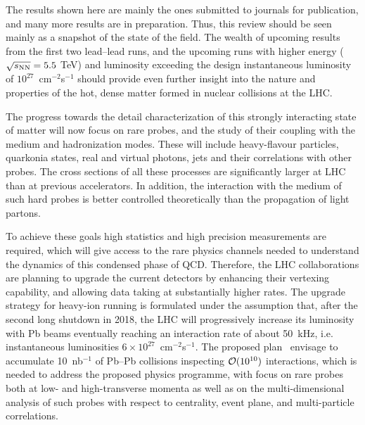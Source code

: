 The results shown here are mainly the ones submitted to journals for publication, and many more
results are in preparation.  Thus, this review should be seen mainly as a snapshot of
the state of the field.  The wealth of upcoming results from the first two lead--lead runs,
and the upcoming runs with higher energy ($\mbox{$\sqrt{s_{\mathrm{NN}}}$} = 5.5$ TeV) and luminosity
exceeding the design instantaneous luminosity of $10^{27}$~cm$^{-2}$s$^{-1}$ should
provide even further insight into
the nature and properties of the hot, dense matter formed in nuclear collisions at the LHC.

The progress towards the detail characterization of this strongly interacting state of matter will now focus on rare probes, and the study of their coupling with the medium and hadronization modes. These will include heavy-flavour particles, quarkonia states, real and virtual photons, jets and their correlations with other probes. The cross sections of all these processes are significantly larger at LHC than at previous accelerators. In addition, the interaction with the medium of such hard probes is better controlled theoretically than the propagation of light partons.

To achieve these goals high statistics and high precision measurements are required, which will give access to the rare physics channels needed to understand the dynamics of this condensed phase of QCD.  Therefore, the LHC collaborations are planning to upgrade the current detectors by enhancing their vertexing capability, and allowing data taking at substantially higher rates.
The upgrade strategy for heavy-ion running is formulated under the assumption that, after the second long shutdown in 2018, the LHC will progressively increase its luminosity with Pb beams eventually reaching an interaction rate of about 50~kHz, i.e. instantaneous luminosities $6 \times 10^{27}$~cm$^{-2}$s$^{-1}$. The proposed plan~\cite{ALICEUpgradeLoI} envisage  to accumulate 10~nb$^{-1}$ of Pb--Pb collisions inspecting ${\cal O}(10^{10})$ interactions, which is needed to address the proposed physics programme, with focus on rare probes both at low- and high-transverse momenta as well as on the multi-dimensional analysis of such probes with respect to centrality, event plane, and multi-particle correlations.

